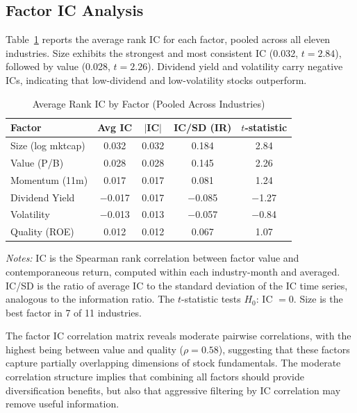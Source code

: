 \documentclass[12pt,a4paper]{article}
\begin{document}
\subsection{Factor IC Analysis}

Table~\ref{tab:ic} reports the average rank IC for each factor, pooled across all eleven industries. Size exhibits the strongest and most consistent IC (0.032, $t = 2.84$), followed by value (0.028, $t = 2.26$). Dividend yield and volatility carry negative ICs, indicating that low-dividend and low-volatility stocks outperform.

\begin{table}[H]
\centering
\caption{Average Rank IC by Factor (Pooled Across Industries)}
\label{tab:ic}
\small
\begin{tabular}{lcccc}
\toprule
\textbf{Factor} & \textbf{Avg IC} & \textbf{$|$IC$|$} & \textbf{IC/SD (IR)} & \textbf{$t$-statistic} \\
\midrule
Size (log mktcap)     &  0.032 & 0.032 & 0.184 & 2.84 \\
Value (P/B)           &  0.028 & 0.028 & 0.145 & 2.26 \\
Momentum (11m)        &  0.017 & 0.017 & 0.081 & 1.24 \\
Dividend Yield        & $-$0.017 & 0.017 & $-$0.085 & $-$1.27 \\
Volatility            & $-$0.013 & 0.013 & $-$0.057 & $-$0.84 \\
Quality (ROE)         &  0.012 & 0.012 & 0.067 & 1.07 \\
\bottomrule
\end{tabular}
\begin{minipage}{\textwidth}
\vspace{0.3em}
\footnotesize
\textit{Notes:} IC is the Spearman rank correlation between factor value and contemporaneous return, computed within each industry-month and averaged. IC/SD is the ratio of average IC to the standard deviation of the IC time series, analogous to the information ratio. The $t$-statistic tests $H_0$: IC $= 0$. Size is the best factor in 7 of 11 industries.
\end{minipage}
\end{table}

The factor IC correlation matrix reveals moderate pairwise correlations, with the highest being between value and quality ($\rho = 0.58$), suggesting that these factors capture partially overlapping dimensions of stock fundamentals. The moderate correlation structure implies that combining all factors should provide diversification benefits, but also that aggressive filtering by IC correlation may remove useful information.
\end{document}
